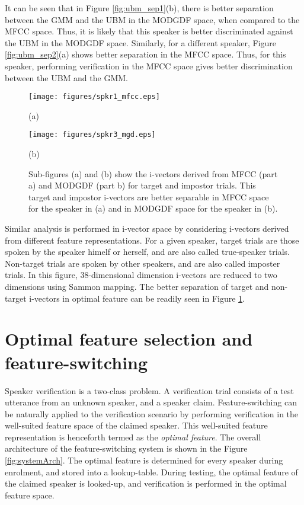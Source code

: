 \documentclass{article}
\begin{document}
It can be seen that in Figure \ref{fig:ubm_sep1}(b), there is  better separation
between the GMM and the UBM in the MODGDF space, when compared to the MFCC
space. Thus, it is likely that this speaker is better discriminated against the
UBM in the MODGDF space. Similarly, for a different speaker, Figure
\ref{fig:ubm_sep2}(a) shows better separation in the MFCC space. Thus, for this
speaker, performing verification in the MFCC space gives better discrimination
between the UBM and the GMM. 

\begin{figure}[h!tb]
\centering \hspace{-5cm}
\begin{minipage}{0.65\textwidth}
\centering 
\texttt{[image: figures/spkr1\_mfcc.eps]}
\caption*{(a)}
\label{fig:subfig3}
\end{minipage}%
\begin{minipage}{0.25\textwidth}
\centering \hspace{10cm}
\texttt{[image: figures/spkr3\_mgd.eps]}
\caption*{(b)}
\label{fig:subfig4}
\end{minipage}
\caption{Sub-figures (a) and (b) show the i-vectors derived from MFCC (part a)
and MODGDF (part b) for target and impostor trials. This target and impostor
i-vectors are better separable in MFCC space for the speaker in (a)
and in MODGDF space for the speaker  in (b).}
\label{fig:ivec_separation}
\end{figure}

Similar analysis is performed in i-vector space by considering i-vectors derived
from different feature representations.  For a given speaker, target trials are
those spoken by the speaker himelf or herself, and are also called true-speaker
trials. Non-target trials are spoken by other speakers, and are also called
imposter trials. In this figure, 38-dimensional dimension i-vectors are reduced
to two dimensions using Sammon mapping. The better separation of target and
non-target i-vectors in optimal feature  can be readily seen in Figure
\ref{fig:ivec_separation}.  


\section{Optimal feature selection and feature-switching}
\label{sec:optFeat}

Speaker verification is a two-class problem. A verification trial consists of a
test utterance from an unknown speaker, and a speaker claim. Feature-switching
can be naturally applied to the verification scenario by performing
verification in the well-suited feature space of the claimed speaker. This
well-suited feature representation is henceforth termed as the \emph{optimal
feature}. The overall architecture of the feature-switching system is shown in the
Figure \ref{fig:systemArch}. The optimal feature is determined for every speaker
during enrolment, and stored into a lookup-table. During testing, the optimal
feature of the claimed speaker is looked-up, and verification is performed in
the optimal feature space.
\end{document}
